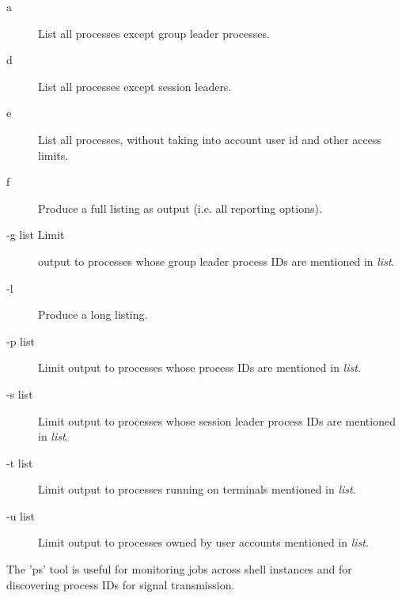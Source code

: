\begin{description}
\item[a]List all processes except group leader processes.
\item[d]List all processes except session leaders.
\item[e]List all processes, without taking into account user id and other access limits.
\item[f]Produce a full listing as output (i.e. all reporting options).
\item[-g list Limit] output to processes whose group leader process IDs are mentioned in \textit{list}.
\item[-l]Produce a long listing.
\item[-p list] Limit output to processes whose process IDs are mentioned in \textit{list}.
\item[-s list] Limit output to processes whose session leader process IDs are mentioned in \textit{list}.
\item[-t list] Limit output to processes running on terminals mentioned in \textit{list}.
\item[-u list] Limit output to processes owned by user accounts mentioned in \textit{list}.
\end{description}

The 'ps' tool is useful for monitoring jobs across shell instances and for
discovering process IDs for signal transmission.
